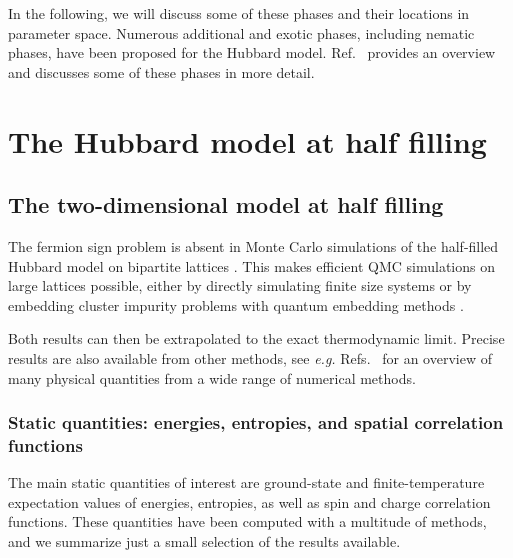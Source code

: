 \documentclass{ar-1col}
\begin{document}
In the following, we will discuss some of these phases and their locations in parameter space. Numerous additional and exotic phases, including nematic phases, have been proposed for the Hubbard model. Ref.~\cite{Arovas21} provides an overview and discusses some of these phases in more detail.

\section{The Hubbard model at half filling}
\label{sec:half-filling}
\subsection{The two-dimensional model at half filling}
The fermion sign problem is absent in Monte Carlo simulations of the half-filled Hubbard model on bipartite lattices \cite{Hirsch85}. This makes efficient QMC simulations on large lattices possible, either by directly simulating finite size systems or by embedding cluster impurity problems with quantum embedding methods \cite{Maier05A}.\begin{marginnote}
\end{marginnote}Both results can then be extrapolated to the exact thermodynamic limit. Precise results are also available from other methods, see {\it e.g.}
Refs.~\cite{LeBlanc15,Schaefer21A} for an overview of many physical quantities from a wide range of numerical methods.
\subsubsection{Static quantities: energies, entropies, and spatial correlation functions} The main static quantities of interest are ground-state and finite-temperature expectation values of energies, entropies, as well as spin and charge correlation functions. These quantities have been computed with a multitude of methods, and we summarize just a small selection of the results available.
\end{document}
